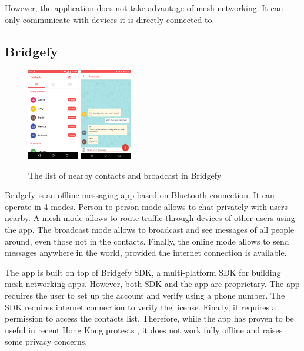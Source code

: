 \documentclass[conference,compsoc]{IEEEtran}
\begin{document}
However, the application does not take advantage of mesh networking. It can only communicate with devices it is directly connected to.

\subsection{Bridgefy}

\begin{figure}[h]
  \centering
  \includegraphics[width=0.2\textwidth]{bridgefy1}
  \includegraphics[width=0.2\textwidth]{bridgefy2}
  \caption{The list of nearby contacts and broadcast in Bridgefy \cite{bridgefy_gplay}}
\end{figure}

Bridgefy is an offline messaging app based on Bluetooth connection. It can operate in 4 modes. Person to person mode allows to chat privately with users nearby. A mesh mode allows to route traffic through devices of other users using the app. The broadcast mode allows to broadcast and see messages of all people around, even those not in the contacts. Finally, the online mode allows to send messages anywhere in the world, provided the internet connection is available.

The app is built on top of Bridgefy SDK, a multi-platform SDK for building mesh networking apps. However, both SDK and the app are proprietary. The app requires the user to set up the account and verify using a phone number. The SDK requires internet connection to verify the license. Finally, it requires a permission to access the contacts list. Therefore, while the app has proven to be useful in recent Hong Kong protests \cite{forbes:hk}, it does not work fully offline and raises some privacy concerns.
\end{document}
